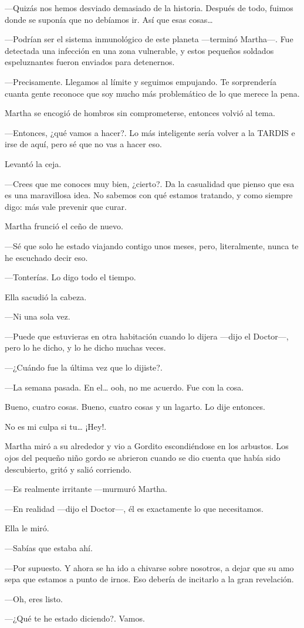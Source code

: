 ---Quizás nos hemos desviado demasiado de la historia. Después de todo, fuimos donde se suponía que no debíamos ir. Así que esas cosas\ldots{}

---Podrían ser el sistema inmunológico de este planeta ---terminó Martha---. Fue detectada una infección en una zona vulnerable, y estos pequeños soldados espeluznantes fueron enviados para detenernos.

---Precisamente. Llegamos al límite y seguimos empujando. Te sorprendería cuanta gente reconoce que soy mucho más problemático de lo que merece la pena.

Martha se encogió de hombros sin comprometerse, entonces volvió al tema.

---Entonces, ¿qué vamos a hacer?. Lo más inteligente sería volver a la TARDIS e irse de aquí, pero sé que no vas a hacer eso.

Levantó la ceja.

---Crees que me conoces muy bien, ¿cierto?. Da la casualidad que pienso que esa es una maravillosa idea. No sabemos con qué estamos tratando, y como siempre digo: más vale prevenir que curar.

Martha frunció el ceño de nuevo.

---Sé que solo he estado viajando contigo unos meses, pero, literalmente, nunca te he escuchado decir eso.

---Tonterías. Lo digo todo el tiempo.

Ella sacudió la cabeza.

---Ni una sola vez.

---Puede que estuvieras en otra habitación cuando lo dijera ---dijo el Doctor---, pero lo he dicho, y lo he dicho muchas veces.

---¿Cuándo fue la última vez que lo dijiste?.

---La semana pasada. En el\ldots{} ooh, no me acuerdo. Fue con la cosa.

Bueno, cuatro cosas. Bueno, cuatro cosas y un lagarto. Lo dije entonces.

No es mi culpa si tu\ldots{} ¡Hey!.

Martha miró a su alrededor y vio a Gordito escondiéndose en los arbustos. Los ojos del pequeño niño gordo se abrieron cuando se dio cuenta que había sido descubierto, gritó y salió corriendo.

---Es realmente irritante ---murmuró Martha.

---En realidad ---dijo el Doctor---, él es exactamente lo que necesitamos.

Ella le miró.

---Sabías que estaba ahí.

---Por supuesto. Y ahora se ha ido a chivarse sobre nosotros, a dejar que su amo sepa que estamos a punto de irnos. Eso debería de incitarlo a la gran revelación.

---Oh, eres listo.

---¿Qué te he estado diciendo?. Vamos.

